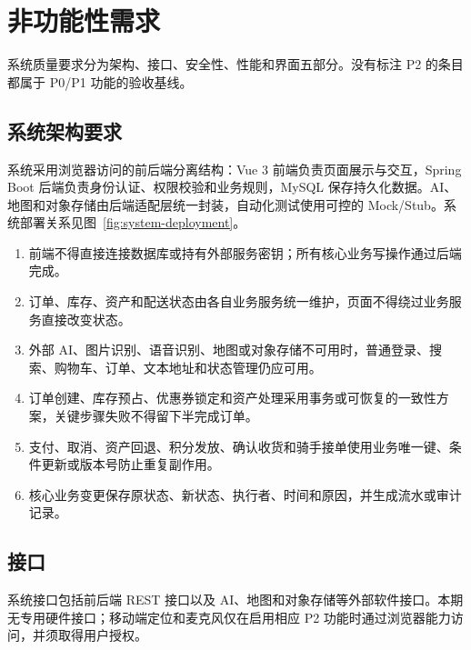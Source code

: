 \section{非功能性需求}

系统质量要求分为架构、接口、安全性、性能和界面五部分。没有标注 P2 的条目都属于 P0/P1 功能的验收基线。

\subsection{系统架构要求}

系统采用浏览器访问的前后端分离结构：Vue 3 前端负责页面展示与交互，Spring Boot 后端负责身份认证、权限校验和业务规则，MySQL 保存持久化数据。AI、地图和对象存储由后端适配层统一封装，自动化测试使用可控的 Mock/Stub。系统部署关系见图~\ref{fig:system-deployment}。


\begin{enumerate}
  \item 前端不得直接连接数据库或持有外部服务密钥；所有核心业务写操作通过后端完成。
  \item 订单、库存、资产和配送状态由各自业务服务统一维护，页面不得绕过业务服务直接改变状态。
  \item 外部 AI、图片识别、语音识别、地图或对象存储不可用时，普通登录、搜索、购物车、订单、文本地址和状态管理仍应可用。
  \item 订单创建、库存预占、优惠券锁定和资产处理采用事务或可恢复的一致性方案，关键步骤失败不得留下半完成订单。
  \item 支付、取消、资产回退、积分发放、确认收货和骑手接单使用业务唯一键、条件更新或版本号防止重复副作用。
  \item 核心业务变更保存原状态、新状态、执行者、时间和原因，并生成流水或审计记录。
\end{enumerate}

\subsection{接口}

系统接口包括前后端 REST 接口以及 AI、地图和对象存储等外部软件接口。本期无专用硬件接口；移动端定位和麦克风仅在启用相应 P2 功能时通过浏览器能力访问，并须取得用户授权。

